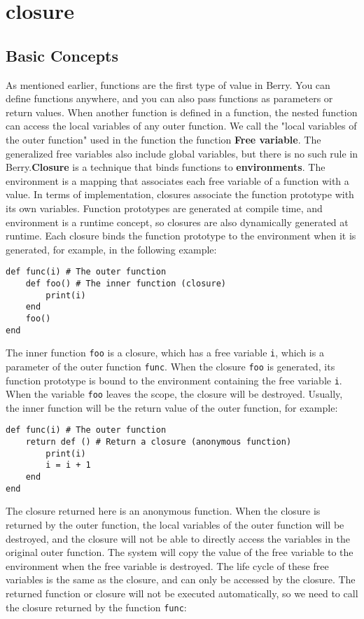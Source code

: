 \section{closure}

\subsection {Basic Concepts}

As mentioned earlier, functions are the first type of value in Berry. You can define functions anywhere, and you can also pass functions as parameters or return values. When another function is defined in a function, the nested function can access the local variables of any outer function. We call the "local variables of the outer function" used in the function the function \textbf{Free variable}. The generalized free variables also include global variables, but there is no such rule in Berry.\textbf{Closure} is a technique that binds functions to \textbf{environments}. The environment is a mapping that associates each free variable of a function with a value. In terms of implementation, closures associate the function prototype with its own variables. Function prototypes are generated at compile time, and environment is a runtime concept, so closures are also dynamically generated at runtime. Each closure binds the function prototype to the environment when it is generated, for example, in the following example:
\begin{lstlisting}[language=berry]
def func(i) # The outer function
    def foo() # The inner function (closure)
        print(i)
    end
    foo()
end
\end{lstlisting}
The inner function \texttt{foo} is a closure, which has a free variable \texttt{i}, which is a parameter of the outer function \texttt{func}. When the closure \texttt{foo} is generated, its function prototype is bound to the environment containing the free variable \texttt{i}. When the variable \texttt{foo} leaves the scope, the closure will be destroyed. Usually, the inner function will be the return value of the outer function, for example:
\begin{lstlisting}[language=berry]
def func(i) # The outer function
    return def () # Return a closure (anonymous function)
        print(i)
        i = i + 1
    end
end
\end{lstlisting}
The closure returned here is an anonymous function. When the closure is returned by the outer function, the local variables of the outer function will be destroyed, and the closure will not be able to directly access the variables in the original outer function. The system will copy the value of the free variable to the environment when the free variable is destroyed. The life cycle of these free variables is the same as the closure, and can only be accessed by the closure. The returned function or closure will not be executed automatically, so we need to call the closure returned by the function \texttt{func}:
